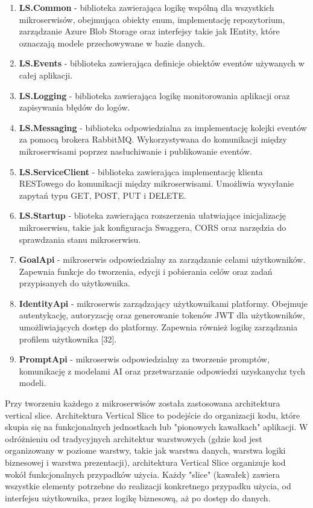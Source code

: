 \begin{enumerate}
\item {\bf LS.Common} - biblioteka zawierająca logikę wspólną dla wszystkich mikroserwisów, obejmująca obiekty enum, implementację repozytorium, zarządzanie Azure Blob Storage oraz interfejsy takie jak IEntity, które oznaczają modele przechowywane w bazie danych.
\item {\bf LS.Events} - biblioteka zawierająca definicje obiektów eventów używanych w całej aplikacji.
\item {\bf LS.Logging} - biblioteka zawierająca logikę monitorowania aplikacji oraz zapisywania błędów do logów.
\item {\bf LS.Messaging} - biblioteka odpowiedzialna za implementację kolejki eventów za pomocą brokera RabbitMQ. Wykorzystywana do komunikacji między mikroserwisami poprzez nasłuchiwanie i publikowanie eventów.
\item {\bf LS.ServiceClient} - biblioteka zawierająca implementację klienta RESTowego do komunikacji między mikroserwisami. Umożliwia wysyłanie zapytań typu GET, POST, PUT i DELETE.
\item {\bf LS.Startup} - blioteka zawierająca rozszerzenia ułatwiające inicjalizację mikroserwisu, takie jak konfiguracja Swaggera, CORS oraz narzędzia do sprawdzania stanu mikroserwisu.
\item {\bf GoalApi} - mikroserwis odpowiedzialny za zarządzanie celami użytkowników. Zapewnia funkcje do tworzenia, edycji i pobierania celów oraz zadań przypisanych do użytkownika.
\item {\bf IdentityApi} - mikroserwis zarządzający użytkownikami platformy. Obejmuje autentykację, autoryzację oraz generowanie tokenów JWT dla użytkowników, umożliwiających dostęp do platformy. Zapewnia również logikę zarządzania profilem użytkownika [32].
\item {\bf PromptApi} - mikroserwis odpowiedzialny za tworzenie promptów, komunikację z modelami AI oraz przetwarzanie odpowiedzi uzyskanych\linebreak z tych modeli.
\end{enumerate}

Przy tworzeniu każdego z mikroserwisów została zastosowana architektura vertical slice. Architektura Vertical Slice to podejście do organizacji kodu, które skupia się na funkcjonalnych jednostkach lub "pionowych kawałkach" aplikacji. W odróżnieniu od tradycyjnych architektur warstwowych (gdzie kod jest organizowany w poziome warstwy, takie jak warstwa danych, warstwa logiki biznesowej i warstwa prezentacji), architektura Vertical Slice organizuje kod wokół funkcjonalnych przypadków użycia. Każdy "slice" (kawałek) zawiera wszystkie elementy potrzebne do realizacji konkretnego przypadku użycia, od interfejsu użytkownika, przez logikę biznesową, aż po dostęp do danych.

